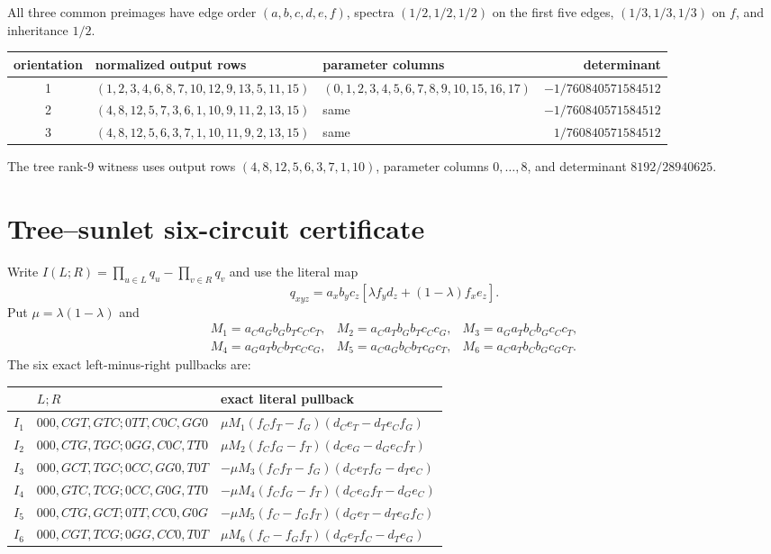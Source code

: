 \documentclass[10pt]{article}
\begin{document}
All three common preimages have edge order \((a,b,c,d,e,f)\), spectra
\((1/2,1/2,1/2)\) on the first five edges,
\((1/3,1/3,1/3)\) on \(f\), and inheritance \(1/2\).

\begin{center}
\begingroup
\scriptsize
\setlength{\tabcolsep}{3.5pt}
\begin{tabular}{cL{.35\linewidth}L{.35\linewidth}r}
\toprule
orientation & normalized output rows & parameter columns & determinant\\
 & \((1,2,3,4,6,8,7,10,12,9,13,5,11,15)\)
& \((0,1,2,3,4,5,6,7,8,9,10,15,16,17)\)
& \(-1/760840571584512\)\\
2 & \((4,8,12,5,7,3,6,1,10,9,11,2,13,15)\)
& same & \(-1/760840571584512\)\\
3 & \((4,8,12,5,6,3,7,1,10,11,9,2,13,15)\)
& same & \(1/760840571584512\)\\
\bottomrule
\end{tabular}
\endgroup
\end{center}

The tree rank-\(9\) witness uses output rows
\((4,8,12,5,6,3,7,1,10)\), parameter columns \(0,\ldots,8\), and determinant
\(8192/28940625\).

\section{Tree--sunlet six-circuit certificate}

Write \(I(L;R)=\prod_{u\in L}q_u-\prod_{v\in R}q_v\) and use the literal map
\[
q_{xyz}=a_xb_yc_z[\lambda f_y d_z+(1-\lambda)f_xe_z].
\]
Put \(\mu=\lambda(1-\lambda)\) and
\[
\begin{array}{lll}
M_1=a_Ca_Gb_Gb_Tc_Cc_T,&M_2=a_Ca_Tb_Gb_Tc_Cc_G,&
M_3=a_Ga_Tb_Cb_Gc_Cc_T,\\
M_4=a_Ga_Tb_Cb_Tc_Cc_G,&M_5=a_Ca_Gb_Cb_Tc_Gc_T,&
M_6=a_Ca_Tb_Cb_Gc_Gc_T.
\end{array}
\]
The six exact left-minus-right pullbacks are:

\begin{longtable}{cL{.30\linewidth}L{.53\linewidth}}
\toprule
 & \(L;R\) & exact literal pullback\\
\midrule
\endhead
\(I_1\) & \(000,CGT,GTC;0TT,C0C,GG0\)
& \(\mu M_1(f_Cf_T-f_G)(d_Ce_T-d_Te_Cf_G)\)\\
\(I_2\) & \(000,CTG,TGC;0GG,C0C,TT0\)
& \(\mu M_2(f_Cf_G-f_T)(d_Ce_G-d_Ge_Cf_T)\)\\
\(I_3\) & \(000,GCT,TGC;0CC,GG0,T0T\)
& \(-\mu M_3(f_Cf_T-f_G)(d_Ce_Tf_G-d_Te_C)\)\\
\(I_4\) & \(000,GTC,TCG;0CC,G0G,TT0\)
& \(-\mu M_4(f_Cf_G-f_T)(d_Ce_Gf_T-d_Ge_C)\)\\
\(I_5\) & \(000,CTG,GCT;0TT,CC0,G0G\)
& \(-\mu M_5(f_C-f_Gf_T)(d_Ge_T-d_Te_Gf_C)\)\\
\(I_6\) & \(000,CGT,TCG;0GG,CC0,T0T\)
& \(\mu M_6(f_C-f_Gf_T)(d_Ge_Tf_C-d_Te_G)\)\\
\bottomrule
\end{longtable}
\end{document}
